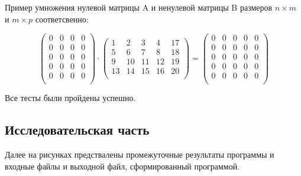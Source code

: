 \documentclass[12pt, a4paper]{article}
\begin{document}
Пример умножения нулевой матрицы A и ненулевой матрицы B размеров $n \times m$ и $m \times p$ соответсвенно:

\[
\begin{pmatrix}
    0 & 0 & 0 & 0\\
    0 & 0 & 0 & 0\\ 
    0 & 0 & 0 & 0\\
    0 & 0 & 0 & 0\\
    0 & 0 & 0 & 0\\
\end{pmatrix}
\cdot
\begin{pmatrix}
    1 & 2 & 3 & 4 & 17\\
    5 & 6 & 7 & 8 & 18\\ 
    9 & 10 & 11 & 12 & 19\\
    13 & 14 & 15 & 16 & 20\\
\end{pmatrix}
=
\begin{pmatrix}
    0 & 0 & 0 & 0 & 0\\
    0 & 0 & 0 & 0 & 0\\ 
    0 & 0 & 0 & 0 & 0\\
    0 & 0 & 0 & 0 & 0\\
    0 & 0 & 0 & 0 & 0\\
\end{pmatrix}
\]

Все тесты были пройдены успешно.

\newpage
\begin{center}
    \section{Исследовательская часть}
\end{center}

Далее на рисунках предствалены промежуточные результаты программы и входные файлы и выходной файл, сформированный программой.
\end{document}
